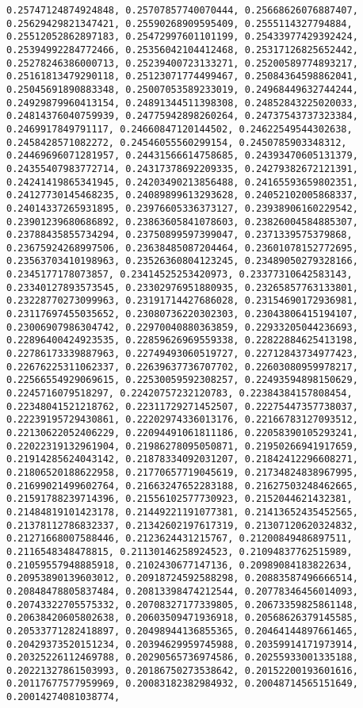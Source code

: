 \documentclass[11pt]{article}
\begin{document}
\begin{Verbatim}[commandchars=\\\{\}]
0.25747124874924848, 0.25707857740070444, 0.25668626076887407, 0.25629429821347421, 0.25590268909595409, 0.2555114327794884, 0.25512052862897183, 0.25472997601101199, 0.25433977429392424, 0.25394992284772466, 0.25356042104412468, 0.25317126825652442, 0.25278246386000713, 0.25239400723133271, 0.25200589774893217, 0.25161813479290118, 0.25123071774499467, 0.25084364598862041, 0.25045691890883348, 0.25007053589233019, 0.24968449632744244, 0.24929879960413154, 0.24891344511398308, 0.24852843225020033, 0.24814376040759939, 0.24775942898260264, 0.24737543737323384, 0.2469917849791117, 0.24660847120144502, 0.24622549544302638, 0.2458428571082272, 0.24546055560299154, 0.2450785903348312, 0.24469696071281957, 0.24431566614758685, 0.24393470605131379, 0.24355407983772714, 0.24317378692209335, 0.24279382672121391, 0.24241419865341945, 0.24203490213856488, 0.24165593659802351, 0.24127730145468235, 0.24089899613293628, 0.24052102005868337, 0.24014337265931895, 0.23976605336373127, 0.23938906160229542, 0.23901239680686892, 0.23863605841078603, 0.23826004584885307, 0.23788435855734294, 0.23750899597399047, 0.2371339575379868, 0.23675924268997506, 0.23638485087204464, 0.23601078152772695, 0.23563703410198963, 0.23526360804123245, 0.23489050279328166, 0.2345177178073857, 0.23414525253420973, 0.23377310642583143, 0.23340127893573545, 0.23302976951880935, 0.23265857763133801, 0.23228770273099963, 0.23191714427686028, 0.23154690172936981, 0.23117697455035652, 0.23080736220302303, 0.23043806415194107, 0.23006907986304742, 0.22970040880363859, 0.22933205044236693, 0.22896400424923535, 0.22859626969559338, 0.22822884625413198, 0.22786173339887963, 0.22749493060519727, 0.22712843734977423, 0.22676225311062337, 0.22639637736707702, 0.22603080959978217, 0.22566554929069615, 0.22530059592308257, 0.22493594898150629, 0.2245716079518297, 0.22420757232120783, 0.22384384157808454, 0.22348041521218762, 0.22311729271452507, 0.22275447357738037, 0.22239195729430861, 0.22202974336013176, 0.22166783127093512, 0.22130622052406229, 0.22094491061811186, 0.22058390105293241, 0.22022319132961904, 0.21986278095050871, 0.21950266941917659, 0.21914285624043142, 0.21878334092031207, 0.21842412296608271, 0.21806520188622958, 0.21770657719045619, 0.21734824838967995, 0.21699021499602764, 0.21663247652283188, 0.21627503248462665, 0.21591788239714396, 0.21556102577730923, 0.2152044621432381, 0.21484819101423178, 0.21449221191077381, 0.21413652435452565, 0.21378112786832337, 0.21342602197617319, 0.21307120620324832, 0.21271668007588446, 0.2123624431215767, 0.21200849486897511, 0.2116548348478815, 0.21130146258924523, 0.21094837762515989, 0.21059557948885918, 0.2102430677147136, 0.20989084183822634, 0.20953890139603012, 0.20918724592588298, 0.20883587496666514, 0.20848478805837484, 0.20813398474212544, 0.20778346456014093, 0.20743322705575332, 0.20708327177339805, 0.20673359825861148, 0.20638420605802638, 0.20603509471936918, 0.20568626379145585, 0.20533771282418897, 0.20498944136855365, 0.20464144897661465, 0.20429373520151234, 0.20394629959745988, 0.20359914171973914, 0.20325226112469788, 0.20290565736974586, 0.20255933001335188, 0.20221327861503993, 0.20186750273538642, 0.20152200193601616, 0.20117677577959969, 0.20083182382984932, 0.20048714565151649, 0.20014274081038774, 
\end{Verbatim}
\end{document}
